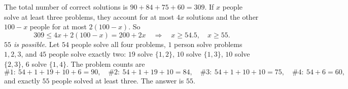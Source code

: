 The total number of correct solutions is $90+84+75+60=309$. If $x$ people solve at least three problems, they account for at most $4x$ solutions and the other $100-x$ people for at most $2(100-x)$. So
\[
309\le4x+2(100-x)=200+2x\quad\Longrightarrow\quad x\ge54.5,\quad x\ge55 .
\]
\emph{$55$ is possible.} Let $54$ people solve all four problems, $1$ person solve problems $1,2,3$, and $45$ people solve exactly two: $19$ solve $\{1,2\}$, $10$ solve $\{1,3\}$, $10$ solve $\{2,3\}$, $6$ solve $\{1,4\}$. The problem counts are
\[
\#1:\ 54+1+19+10+6=90,\quad \#2:\ 54+1+19+10=84,\quad \#3:\ 54+1+10+10=75,\quad \#4:\ 54+6=60,
\]
and exactly $55$ people solved at least three. The answer is $\boxed{55}$.

